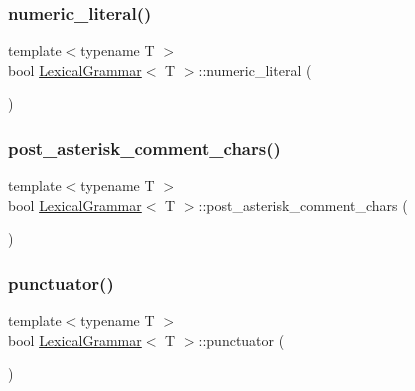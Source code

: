 \mbox{\label{class_lexical_grammar_a6dd9a9a8baf50e9a99e0df2cbaa8d795}} 
\subsubsection{\texorpdfstring{numeric\+\_\+literal()}{numeric\_literal()}}
{\footnotesize\ttfamily template$<$typename T $>$ \\
bool \hyperlink{class_lexical_grammar}{Lexical\+Grammar}$<$ T $>$\+::numeric\+\_\+literal (\begin{DoxyParamCaption}{ }\end{DoxyParamCaption})\hspace{0.3cm}{\ttfamily [inline]}}

\mbox{\label{class_lexical_grammar_a87186e7112da8a1bd4abeb3edc07ff51}} 
\subsubsection{\texorpdfstring{post\+\_\+asterisk\+\_\+comment\+\_\+chars()}{post\_asterisk\_comment\_chars()}}
{\footnotesize\ttfamily template$<$typename T $>$ \\
bool \hyperlink{class_lexical_grammar}{Lexical\+Grammar}$<$ T $>$\+::post\+\_\+asterisk\+\_\+comment\+\_\+chars (\begin{DoxyParamCaption}{ }\end{DoxyParamCaption})\hspace{0.3cm}{\ttfamily [inline]}}

\mbox{\label{class_lexical_grammar_a1d2f4fe7c1039c89dbbe4309f7a2d35a}} 
\subsubsection{\texorpdfstring{punctuator()}{punctuator()}}
{\footnotesize\ttfamily template$<$typename T $>$ \\
bool \hyperlink{class_lexical_grammar}{Lexical\+Grammar}$<$ T $>$\+::punctuator (\begin{DoxyParamCaption}{ }\end{DoxyParamCaption})\hspace{0.3cm}{\ttfamily [inline]}}

